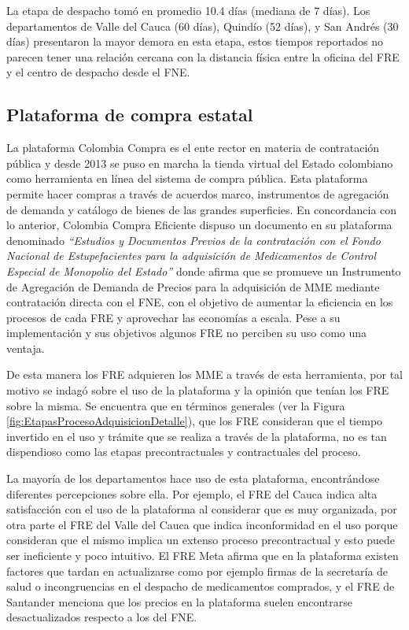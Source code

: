 \documentclass[
]{book}
\begin{document}
La etapa de despacho tomó en promedio 10.4 días (mediana de 7 días). Los departamentos de Valle del Cauca (60 días), Quindío (52 días), y San Andrés (30 días) presentaron la mayor demora en esta etapa, estos tiempos reportados no parecen tener una relación cercana con la distancia física entre la oficina del FRE y el centro de despacho desde el FNE.

\hypertarget{plataforma-de-compra-estatal}{%
\subsection{Plataforma de compra estatal}\label{plataforma-de-compra-estatal}}

La plataforma Colombia Compra es el ente rector en materia de contratación pública y desde 2013 se puso en marcha la tienda virtual del Estado colombiano como herramienta en línea del sistema de compra pública. Esta plataforma permite hacer compras a través de acuerdos marco, instrumentos de agregación de demanda y catálogo de bienes de las grandes superficies. En concordancia con lo anterior, Colombia Compra Eficiente dispuso un documento en su plataforma denominado \emph{``Estudios y Documentos Previos de la contratación con el Fondo Nacional de Estupefacientes para la adquisición de Medicamentos de Control Especial de Monopolio del Estado''} donde afirma que se promueve un Instrumento de Agregación de Demanda de Precios para la adquisición de MME mediante contratación directa con el FNE, con el objetivo de aumentar la eficiencia en los procesos de cada FRE y aprovechar las economías a escala. Pese a su implementación y sus objetivos algunos FRE no perciben su uso como una ventaja.

De esta manera los FRE adquieren los MME a través de esta herramienta, por tal motivo se indagó sobre el uso de la plataforma y la opinión que tenían los FRE sobre la misma. Se encuentra que en términos generales (ver la Figura \ref{fig:EtapasProcesoAdquisicionDetalle}), que los FRE consideran que el tiempo invertido en el uso y trámite que se realiza a través de la plataforma, no es tan dispendioso como las etapas precontractuales y contractuales del proceso.

La mayoría de los departamentos hace uso de esta plataforma, encontrándose diferentes percepciones sobre ella. Por ejemplo, el FRE del Cauca indica alta satisfacción con el uso de la plataforma al considerar que es muy organizada, por otra parte el FRE del Valle del Cauca que indica inconformidad en el uso porque consideran que el mismo implica un extenso proceso precontractual y esto puede ser ineficiente y poco intuitivo. El FRE Meta afirma que en la plataforma existen factores que tardan en actualizarse como por ejemplo firmas de la secretaría de salud o incongruencias en el despacho de medicamentos comprados, y el FRE de Santander menciona que los precios en la plataforma suelen encontrarse desactualizados respecto a los del FNE.
\end{document}
